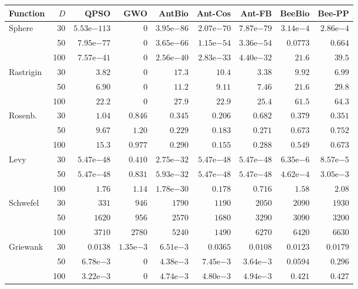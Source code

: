 \begin{tabular}{lrrrrrrrr}
\toprule
Function & $D$ & QPSO & GWO & AntBio & Ant-Cos & Ant-FB & BeeBio & Bee-PP \\
\midrule
Sphere & 30 & $5.53\mathrm{e}{-113}$ & $0$ & $3.95\mathrm{e}{-86}$ & $2.07\mathrm{e}{-70}$ & $7.87\mathrm{e}{-79}$ & $3.14\mathrm{e}{-4}$ & $2.86\mathrm{e}{-4}$ \\
 & 50 & $7.95\mathrm{e}{-77}$ & $0$ & $3.65\mathrm{e}{-66}$ & $1.15\mathrm{e}{-54}$ & $3.36\mathrm{e}{-54}$ & $0.0773$ & $0.664$ \\
 & 100 & $7.57\mathrm{e}{-41}$ & $0$ & $2.56\mathrm{e}{-40}$ & $2.83\mathrm{e}{-33}$ & $4.40\mathrm{e}{-32}$ & $21.6$ & $39.5$ \\
\midrule
Rastrigin & 30 & $3.82$ & $0$ & $17.3$ & $10.4$ & $3.38$ & $9.92$ & $6.99$ \\
 & 50 & $6.90$ & $0$ & $11.2$ & $9.11$ & $7.46$ & $21.6$ & $29.8$ \\
 & 100 & $22.2$ & $0$ & $27.9$ & $22.9$ & $25.4$ & $61.5$ & $64.3$ \\
\midrule
Rosenb. & 30 & $1.04$ & $0.846$ & $0.345$ & $0.206$ & $0.682$ & $0.379$ & $0.351$ \\
 & 50 & $9.67$ & $1.20$ & $0.229$ & $0.183$ & $0.271$ & $0.673$ & $0.752$ \\
 & 100 & $15.3$ & $0.977$ & $0.290$ & $0.155$ & $0.288$ & $0.549$ & $0.673$ \\
\midrule
Levy & 30 & $5.47\mathrm{e}{-48}$ & $0.410$ & $2.75\mathrm{e}{-32}$ & $5.47\mathrm{e}{-48}$ & $5.47\mathrm{e}{-48}$ & $6.35\mathrm{e}{-6}$ & $8.57\mathrm{e}{-5}$ \\
 & 50 & $5.47\mathrm{e}{-48}$ & $0.831$ & $5.93\mathrm{e}{-32}$ & $5.47\mathrm{e}{-48}$ & $5.47\mathrm{e}{-48}$ & $4.62\mathrm{e}{-4}$ & $3.05\mathrm{e}{-3}$ \\
 & 100 & $1.76$ & $1.14$ & $1.78\mathrm{e}{-30}$ & $0.178$ & $0.716$ & $1.58$ & $2.08$ \\
\midrule
Schwefel & 30 & $331$ & $946$ & $1790$ & $1190$ & $2050$ & $2090$ & $1930$ \\
 & 50 & $1620$ & $956$ & $2570$ & $1680$ & $3290$ & $3090$ & $3200$ \\
 & 100 & $3710$ & $2780$ & $5240$ & $1490$ & $6270$ & $6420$ & $6630$ \\
\midrule
Griewank & 30 & $0.0138$ & $1.35\mathrm{e}{-3}$ & $6.51\mathrm{e}{-3}$ & $0.0365$ & $0.0108$ & $0.0123$ & $0.0179$ \\
 & 50 & $6.78\mathrm{e}{-3}$ & $0$ & $4.38\mathrm{e}{-3}$ & $7.45\mathrm{e}{-3}$ & $3.64\mathrm{e}{-3}$ & $0.0594$ & $0.296$ \\
 & 100 & $3.22\mathrm{e}{-3}$ & $0$ & $4.74\mathrm{e}{-3}$ & $4.80\mathrm{e}{-3}$ & $4.94\mathrm{e}{-3}$ & $0.421$ & $0.427$ \\
\bottomrule
\end{tabular}

